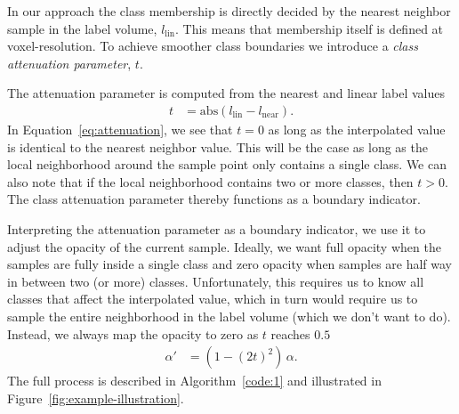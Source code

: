 \documentclass{egpubl}
\begin{document}
In our approach the class membership is directly decided by the nearest neighbor sample in the label volume, $l_\mathrm{lin}$. This means that membership itself is defined at voxel-resolution. To achieve smoother class boundaries we introduce a \emph{class attenuation parameter}, $t$.

The attenuation parameter is computed from the nearest and linear label values
\begin{align}
t &= \mathrm{abs}(l_\mathrm{lin} - l_\mathrm{near})  .  \label{eq:attenuation}
\end{align}
In Equation~\ref{eq:attenuation}, we see that $t=0$ as long as the interpolated value is identical to the nearest neighbor value. This will be the case as long as the local neighborhood around the sample point only contains a single class. We can also note that if the local neighborhood contains two or more classes, then $t > 0$. The class attenuation parameter thereby functions as a boundary indicator.

Interpreting the attenuation parameter as a boundary indicator, we use it to adjust the opacity of the current sample. Ideally, we want full opacity when the samples are fully inside a single class and zero opacity when samples are half way in between two (or more) classes. Unfortunately, this requires us to know all classes that affect the interpolated value, which in turn would require us to sample the entire neighborhood in the label volume (which we don't want to do). Instead, we always map the opacity to zero as $t$ reaches $0.5$ 
\begin{align}
\alpha' &= (1-(2t)^2) \,\alpha  .  \label{eq:alpha}
\end{align}
The full process is described in Algorithm~\ref{code:1} and illustrated in Figure~\ref{fig:example-illustration}.
\end{document}
